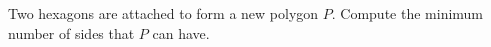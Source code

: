 Two hexagons are attached to form a new polygon $P$. Compute the minimum number of sides that $P$ can have.
